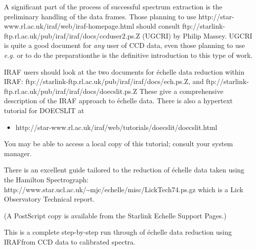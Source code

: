 A significant part of the process of successful spectrum extraction
is the preliminary handling of the  data frames.
Those planning to use
{http://star-www.rl.ac.uk/iraf/web/iraf-homepage.html} should consult
{ftp://starlink-ftp.rl.ac.uk/pub/iraf/iraf/docs/ccduser2.ps.Z} (UGCRI) by Philip Massey.
UGCRI is quite a good document for {\em any} user of CCD data, even those
planning to use {\em e.g.}  or
 to do the preparation\sgspec{---}{ - }the
 is the definitive
introduction to this type of work.

IRAF users should look at the two documents for \'{e}chelle data reduction
within IRAF:
{ftp://starlink-ftp.rl.ac.uk/pub/iraf/iraf/docs/ech.ps.Z}, and
{ftp://starlink-ftp.rl.ac.uk/pub/iraf/iraf/docs/doecslit.ps.Z}
These give a comprehensive description of the IRAF approach to \'{e}chelle
data.  There is also a hypertext tutorial for DOECSLIT at

\begin{itemize}

\item {}
      {http://star-www.rl.ac.uk/iraf/web/tutorials/doecslit/doecslit.html}

\end{itemize}

You may be able to access a local copy of this tutorial; consult your
system manager.

There is an excellent guide tailored to the reduction of \'{e}chelle
data taken using the Hamilton Spectrograph:
{http://www.star.ucl.ac.uk/\~{}mjc/echelle/misc/LickTech74.ps.gz} which is a
Lick Observatory Technical report\@.
\begin{latex}
(A PostScript copy is available from the Starlink Echelle Support
Pages.)
\end{latex}
This is a complete
step-by-step run through of \'{e}chelle data reduction using
IRAF\sgspec{---}{ - }from CCD data to calibrated spectra.

